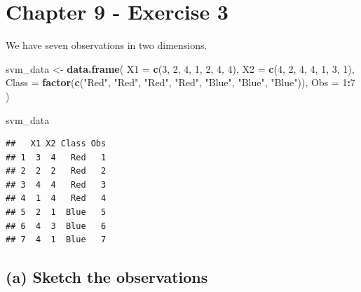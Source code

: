 \documentclass[
]{article}
\newenvironment{Shaded}{\begin{snugshade}}{\end{snugshade}}
\newcommand{\AttributeTok}[1]{\textcolor[rgb]{0.13,0.29,0.53}{#1}}
\newcommand{\DecValTok}[1]{\textcolor[rgb]{0.00,0.00,0.81}{#1}}
\newcommand{\FunctionTok}[1]{\textcolor[rgb]{0.13,0.29,0.53}{\textbf{#1}}}
\newcommand{\NormalTok}[1]{#1}
\newcommand{\OtherTok}[1]{\textcolor[rgb]{0.56,0.35,0.01}{#1}}
\newcommand{\SpecialCharTok}[1]{\textcolor[rgb]{0.81,0.36,0.00}{\textbf{#1}}}
\newcommand{\StringTok}[1]{\textcolor[rgb]{0.31,0.60,0.02}{#1}}
\begin{document}
\section{Chapter 9 - Exercise 3}\label{chapter-9---exercise-3}

We have seven observations in two dimensions.

\begin{Shaded}
\begin{Highlighting}[]
\NormalTok{svm\_data }\OtherTok{\textless{}{-}} \FunctionTok{data.frame}\NormalTok{(}
  \AttributeTok{X1 =} \FunctionTok{c}\NormalTok{(}\DecValTok{3}\NormalTok{, }\DecValTok{2}\NormalTok{, }\DecValTok{4}\NormalTok{, }\DecValTok{1}\NormalTok{, }\DecValTok{2}\NormalTok{, }\DecValTok{4}\NormalTok{, }\DecValTok{4}\NormalTok{),}
  \AttributeTok{X2 =} \FunctionTok{c}\NormalTok{(}\DecValTok{4}\NormalTok{, }\DecValTok{2}\NormalTok{, }\DecValTok{4}\NormalTok{, }\DecValTok{4}\NormalTok{, }\DecValTok{1}\NormalTok{, }\DecValTok{3}\NormalTok{, }\DecValTok{1}\NormalTok{),}
  \AttributeTok{Class =} \FunctionTok{factor}\NormalTok{(}\FunctionTok{c}\NormalTok{(}\StringTok{"Red"}\NormalTok{, }\StringTok{"Red"}\NormalTok{, }\StringTok{"Red"}\NormalTok{, }\StringTok{"Red"}\NormalTok{, }\StringTok{"Blue"}\NormalTok{, }\StringTok{"Blue"}\NormalTok{, }\StringTok{"Blue"}\NormalTok{)),}
  \AttributeTok{Obs =} \DecValTok{1}\SpecialCharTok{:}\DecValTok{7}
\NormalTok{)}

\NormalTok{svm\_data}
\end{Highlighting}
\end{Shaded}

\begin{verbatim}
##   X1 X2 Class Obs
## 1  3  4   Red   1
## 2  2  2   Red   2
## 3  4  4   Red   3
## 4  1  4   Red   4
## 5  2  1  Blue   5
## 6  4  3  Blue   6
## 7  4  1  Blue   7
\end{verbatim}

\subsection{(a) Sketch the
observations}\label{a-sketch-the-observations}
\end{document}
